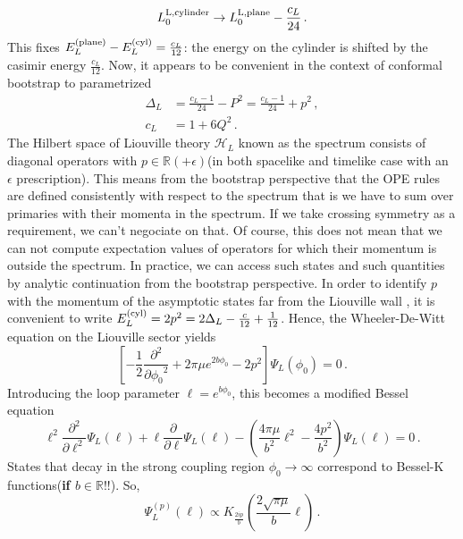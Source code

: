 \documentclass[a4paper]{article}
\begin{document}
\begin{equation}
  L_0^{\rm{L,cylinder}}\to L_0^{\rm{L,plane}} -\frac{c_L}{24}\,.
\end{equation}
This fixes $E^{(\rm plane)}_L-E^{(\rm cyl)}_L = \frac{c_L}{12}$: the energy on the cylinder is shifted by the casimir energy $\frac{c_L}{12}$. Now, it appears to be convenient in the context of conformal bootstrap to parametrized
\begin{equation}
\begin{aligned}
  \Delta_L &= \frac{c_L-1}{24}-P^2 = \frac{c_L-1}{24}+p^2\,,\\
  c_L &= 1+ 6Q^2\,.
\end{aligned}
\end{equation}
The Hilbert space of Liouville theory $\mathcal{H}_L$ known as the spectrum consists of diagonal operators with $p\in \mathbb{R}(+\epsilon)$(in both spacelike and timelike case with an $\epsilon$ prescription). This means from the bootstrap perspective that the OPE rules are defined consistently with respect to the spectrum that is we have to sum over primaries with their momenta in the spectrum. If we take crossing symmetry as a requirement, we can't negociate on that. Of course, this does not mean that we can not compute expectation values of operators for which their momentum is outside the spectrum. In practice, we can access such states and such quantities by analytic continuation from the bootstrap perspective.
In order to identify $p$ with the momentum of the asymptotic states far from the Liouville wall , it is convenient to write $E^{(\rm cyl)}_L=2p^2=2\Delta_L-\frac{c}{12}+\frac{1}{12}$. Hence, the Wheeler-De-Witt equation on the Liouville sector yields
\begin{equation}
  \left[-\frac{1}{2}\frac{\partial^2}{\partial{\phi_0}^2}+2\pi \mu e^{2b\phi_0}-2p^2\right]\Psi_L(\phi_0)=0\,.
\end{equation}
Introducing the loop parameter $\ell = e^{b\phi_0}$, this becomes a modified Bessel equation
\begin{equation}\label{eq:Wheeler-De-Witt-spacelike}
  \ell^2\frac{\partial^2}{\partial{\ell}^2}\Psi_L(\ell)+\ell\frac{\partial}{\partial{\ell}}\Psi_L(\ell)-\left(\frac{4\pi\mu}{b^2}\ell^2-\frac{4p^2}{b^2}\right)\Psi_L(\ell)=0\,.
\end{equation}
States that decay in the strong coupling region $\phi_0\to \infty$ correspond to Bessel-K functions(\textbf{if $b\in \mathbb{R}$}!!). So,
\begin{equation}
  \Psi^{(p)}_L(\ell) \propto K_{\frac{2ip}{b}}\left(\frac{2\sqrt{\pi\mu}}{b}\ell\right)\,.
\end{equation}
\end{document}
